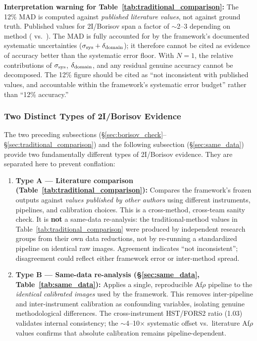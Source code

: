 \documentclass[usenatbib]{mnras}
\begin{document}
\noindent\textbf{Interpretation warning for Table~\ref{tab:traditional_comparison}:} The 12\% MAD is computed against \textit{published literature values}, not against ground truth. Published values for 2I/Borisov span a factor of $\sim$2--3 depending on method (\citealt{clements21} vs.\ \citealt{cremonese20}). The MAD is fully accounted for by the framework's documented systematic uncertainties ($\sigma_{\rm sys} + \delta_{\rm domain}$); it therefore cannot be cited as evidence of accuracy better than the systematic error floor. With $N=1$, the relative contributions of $\sigma_{\rm sys}$, $\delta_{\rm domain}$, and any residual genuine accuracy cannot be decomposed. The 12\% figure should be cited as ``not inconsistent with published values, and accountable within the framework's systematic error budget'' rather than ``12\% accuracy.''

\subsubsection{Two Distinct Types of 2I/Borisov Evidence}\label{sec:borisov_evidence_types}

The two preceding subsections (\S\ref{sec:borisov_check}--\S\ref{sec:traditional_comparison}) and the following subsection (\S\ref{sec:same_data}) provide two fundamentally different types of 2I/Borisov evidence. They are separated here to prevent conflation:

\begin{enumerate}
    \item \textbf{Type A --- Literature comparison (Table~\ref{tab:traditional_comparison}):} Compares the framework's frozen outputs against \textit{values published by other authors} using different instruments, pipelines, and calibration choices. This is a cross-method, cross-team sanity check. It is \textbf{not} a same-data re-analysis: the traditional-method values in Table~\ref{tab:traditional_comparison} were produced by independent research groups from their own data reductions, not by re-running a standardized pipeline on identical raw images. Agreement indicates ``not inconsistent''; disagreement could reflect either framework error or inter-method spread.

    \item \textbf{Type B --- Same-data re-analysis (\S\ref{sec:same_data}, Table~\ref{tab:same_data}):} Applies a single, reproducible Af$\rho$ pipeline to the \textit{identical calibrated images} used by the framework. This removes inter-pipeline and inter-instrument calibration as confounding variables, isolating genuine methodological differences. The cross-instrument HST/FORS2 ratio (1.03) validates internal consistency; the $\sim$4--10$\times$ systematic offset vs.\ literature Af$\rho$ values confirms that absolute calibration remains pipeline-dependent.
\end{enumerate}
\end{document}

